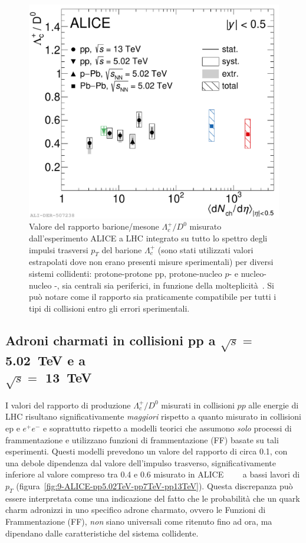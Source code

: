         \begin{figure}[t]
            \centering
            \includegraphics[width=0.65\linewidth]{res/fig/1-chapter/8-ALICE-pp13TeV-pp5.02TeV-pPb5.02TeV-PbPb5.02TeV.pdf}
            \caption{Valore del rapporto barione/mesone $\Lambda_{c}^{+}/D^{0}$ misurato dall'esperimento ALICE a LHC integrato su tutto lo spettro degli impulsi trasversi $p_{T}$ del barione $\Lambda_{c}^{+}$ (sono stati utilizzati valori estrapolati dove non erano presenti misure sperimentali) per diversi sistemi collidenti: protone-protone pp, protone-nucleo $p$- e nucleo-nucleo -, sia centrali sia periferici, in funzione della molteplicità~\cite{Kalteyer_ALICE_2022}. Si può notare come il rapporto sia praticamente compatibile per tutti i tipi di collisioni entro gli errori sperimentali.}
            \label{fig:8-ALICE-pp13TeV-pp5.02TeV-pPb5.02TeV-PbPb5.02TeV}
        \end{figure}

    \subsection%
    [Adroni charmati in collisioni pp a $\sqrt{s} =$ \qty{5.02}{\tera \eV} e a $\sqrt{s} =$ \qty{13}{\tera \eV}]%
    {Adroni charmati in collisioni pp a $\sqrt{s} =$ \qty{5.02}{\tera \eV} e a \\ $\sqrt{s} =$ \qty{13}{\tera \eV}}
        I valori del rapporto di produzione $\Lambda_{c}^{+}/D^{0}$ misurati in collisioni $pp$ alle energie di LHC risultano significativamente \textit{maggiori} rispetto a quanto misurato in collisioni ep e $e^{+} e^{-}$ e soprattutto rispetto a modelli teorici che assumono \textit{solo} processi di frammentazione e utilizzano funzioni di frammentazione (FF) basate su tali esperimenti. Questi modelli prevedono un valore del rapporto di circa \num{0.1}, con una debole dipendenza dal valore dell'impulso trasverso, significativamente inferiore al valore compreso tra \num{0.4} e \num{0.6} misurato in ALICE~\cite{ALICE_2018_pp7Tev_pPb5.02TeV}~\cite{ALICE_2021_pp5.02TeV_pPb5.02TeV_prod}~\cite{ALICE_2021_pp5.02TeV_pPb5.02TeV_prod_ratio}~\cite{ALICE_2022_pp13TeV} a bassi lavori di $p_{T}$ (figura~\ref{fig:9-ALICE-pp5.02TeV-pp7TeV-pp13TeV}). Questa discrepanza può essere interpretata come una indicazione del fatto che le probabilità che un quark charm adronizzi in uno specifico adrone charmato, ovvero le Funzioni di Frammentazione (FF), \textit{non} siano universali come ritenuto fino ad ora, ma dipendano dalle caratteristiche del sistema collidente.
        
